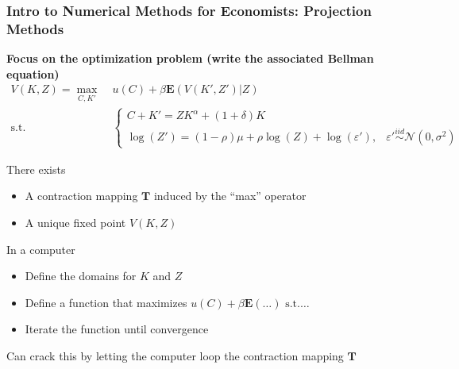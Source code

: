 \documentclass[10pt, aspectratio=1610, handout]{beamer}
\newcommand{\E}{\mathbf{E}}
\begin{document}
  \begin{frame}
    \frametitle{Intro to Numerical Methods for Economists: Projection Methods}

    \textbf{Focus on the optimization problem (write the associated Bellman equation)}
    \begin{align*}
      V(K, Z) = \max_{C, K'} &\; u(C) + \beta \E \left( V(K', Z') | Z \right) \\
      \text{s.t.} &\; \begin{cases}
        C + K' = Z K^\alpha + (1 + \delta) K \\
        \log(Z') = (1-\rho) \mu + \rho \log(Z) + \log(\varepsilon'), & \varepsilon' \overset{iid}{\sim} \mathcal{N}(0, \sigma^2) %
      \end{cases}
    \end{align*}

    \vfill\pause

    There exists
    \begin{itemize}
      \item A contraction mapping $\mathbf{T}$ induced by the ``max'' operator
      \item A unique fixed point $V(K, Z)$
    \end{itemize}

    \vfill\pause

    In a computer
    \begin{itemize}
      \item Define the domains for $K$ and $Z$
      \item Define a function that maximizes $u(C) + \beta \E (\ldots) \text{ s.t.} \ldots$
      \item Iterate the function until convergence
    \end{itemize}

    \vfill\pause

    Can crack this by letting the computer loop the contraction mapping $\mathbf{T}$

  \end{frame}
\end{document}

